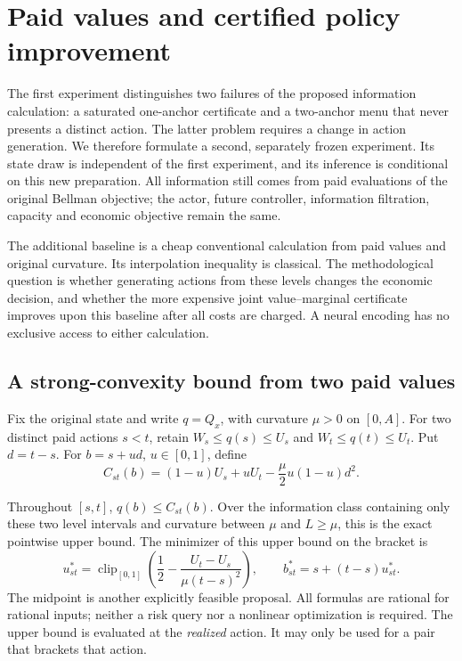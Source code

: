 \section{Paid values and certified policy improvement}
\label{sec:valuebridge124b}

The first experiment distinguishes two failures of the proposed
information calculation: a saturated one-anchor certificate and a
two-anchor menu that never presents a distinct action. The latter
problem requires a change in action generation. We therefore formulate
a second, separately frozen experiment. Its state draw is independent
of the first experiment, and its inference is conditional on this new
preparation.
All information still comes from paid evaluations of the original
Bellman objective; the actor, future controller, information filtration,
capacity and economic objective remain the same.

The additional baseline is a cheap conventional calculation from paid
values and original curvature. Its interpolation inequality is classical.
The methodological question is whether generating actions from these
levels changes the economic decision, and whether the more expensive
joint value--marginal certificate improves upon this baseline after all
costs are charged. A neural encoding has no exclusive access to either
calculation.

\subsection{A strong-convexity bound from two paid values}

Fix the original state and write $q=Q_x$, with curvature $\mu>0$ on
$[0,A]$. For two distinct paid actions $s<t$, retain
$W_s\le q(s)\le U_s$ and $W_t\le q(t)\le U_t$. Put $d=t-s$.
For $b=s+ud$, $u\in[0,1]$, define
\begin{equation}\label{eq:valuebridge124b}
 C_{st}(b)=(1-u)U_s+uU_t-\frac\mu2u(1-u)d^2.
\end{equation}

\begin{proposition}
\label{prop:valuebridge124b}
Throughout $[s,t]$, $q(b)\le C_{st}(b)$. Over the information class
containing only these two level intervals and curvature between
$\mu$ and $L\ge\mu$, this is the exact pointwise upper bound.
The minimizer of this upper bound on the bracket is
\begin{equation}\label{eq:bridgeproposal124b}
 u_{st}^*=\operatorname{clip}_{[0,1]}
       \left(\frac12-\frac{U_t-U_s}{\mu(t-s)^2}\right),
 \qquad b_{st}^*=s+(t-s)u_{st}^*.
\end{equation}
The midpoint is another explicitly feasible proposal. All formulas
are rational for rational inputs; neither a risk query nor a nonlinear
optimization is required. The upper bound is evaluated at the
\emph{realized} action. It may only be used for a pair that brackets
that action.
\end{proposition}

